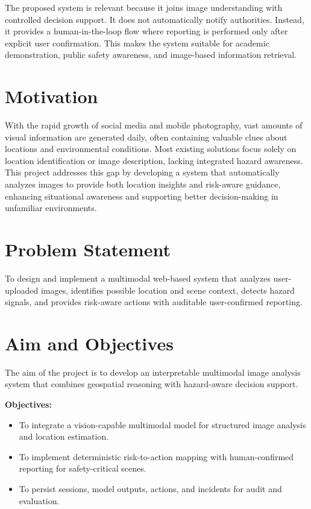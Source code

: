 The proposed system is relevant because it joins image understanding with controlled decision support. It does not automatically notify authorities. Instead, it provides a human-in-the-loop flow where reporting is performed only after explicit user confirmation. This makes the system suitable for academic demonstration, public safety awareness, and image-based information retrieval.

\section{Motivation}
With the rapid growth of social media and mobile photography, vast amounts of visual information are generated daily, often containing valuable clues about locations and environmental conditions. Most existing solutions focus solely on location identification or image description, lacking integrated hazard awareness. This project addresses this gap by developing a system that automatically analyzes images to provide both location insights and risk-aware guidance, enhancing situational awareness and supporting better decision-making in unfamiliar environments.

\section{Problem Statement}
To design and implement a multimodal web-based system that analyzes user-uploaded images, identifies possible location and scene context, detects hazard signals, and provides risk-aware actions with auditable user-confirmed reporting.

\section{Aim and Objectives}
The aim of the project is to develop an interpretable multimodal image analysis system that combines geospatial reasoning with hazard-aware decision support.

{\bfseries Objectives:}
\begin{itemize}
\item To integrate a vision-capable multimodal model for structured image analysis and location estimation.
\item To implement deterministic risk-to-action mapping with human-confirmed reporting for safety-critical scenes.
\item To persist sessions, model outputs, actions, and incidents for audit and evaluation.
\end{itemize}

